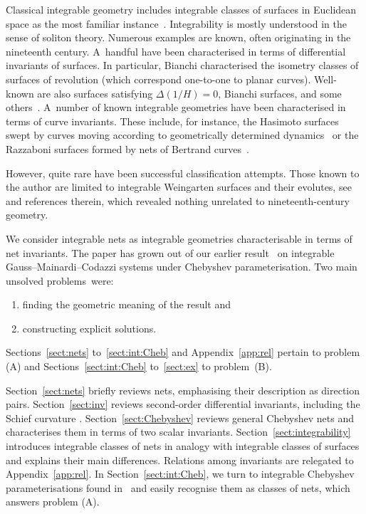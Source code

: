 \documentclass[pdftex]{sigma}
\numberwithin{equation}{section}
\begin{document}
Classical integrable geometry includes integrable classes of surfaces in Euclidean
space as the most familiar instance~\cite{Bob,G-T,R-S,Sym}.
Integrability is mostly understood in the sense of soliton theory.
Numerous examples are known, often originating in the nineteenth century.
A~handful have been characterised in terms of differential invariants of surfaces.
In particular, Bianchi \mbox{\cite[Section~99]{LB-I}} characterised the isometry classes of surfaces
of revolution (which correspond one-to-one to planar curves).
Well-known are also surfaces satisfying
$\Delta(1/H) = 0$, Bianchi surfaces, and some others~\cite{Bob,G-T}.
A~number of known integrable geometries have been characterised in terms
of curve invariants. These include, for instance, the Hasimoto surfaces swept by
curves moving according to geometrically determined dynamics~\cite{HH-1972,R-S}
or the Razzaboni surfaces formed by nets of Bertrand curves~\cite{WKS-2003}.

However, quite rare have been successful classification attempts.
Those known to the author are limited to integrable Weingarten surfaces and their
evolutes, see~\cite{B-M-2010} and references therein, which revealed nothing
unrelated to nineteenth-century geometry.

We consider integrable nets as integrable geometries characterisable in
terms of net invariants.
The paper has grown out of our earlier result~\cite[Section~2]{K-M} on  integrable
Gauss--Mainardi--Codazzi systems under Chebyshev parameterisation.
 Two main unsolved problems~were:
\begin{enumerate}\itemsep=0pt
  \item[(A)] finding the geometric meaning of the result and
  \item[(B)] constructing explicit solutions.
\end{enumerate}
Sections~\ref{sect:nets} to~\ref{sect:int:Cheb} and Appendix~\ref{app:rel}
pertain to problem (A) and Sections~\ref{sect:int:Cheb} to~\ref{sect:ex} to problem~(B).

Section~\ref{sect:nets} briefly reviews nets,
emphasising their description as direction pairs.
Section~\ref{sect:inv} reviews second-order differential invariants,
including  the Schief curvature \cite[Section~3.1]{WKS-2007}.
Section~\ref{sect:Chebyshev} reviews general Chebyshev nets
and characterises them in terms of two scalar invariants.
Section~\ref{sect:integrability} introduces integrable classes of nets in analogy with
integrable classes of surfaces and explains their main differences.
Relations among invariants are relegated to Appendix~\ref{app:rel}.
In Section~\ref{sect:int:Cheb}, we turn to integrable Chebyshev
parameterisations found in~\cite[Section~2]{K-M} and
easily recognise them as classes of nets, which answers problem (A).
\end{document}
